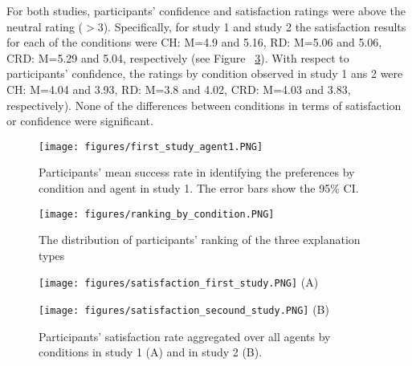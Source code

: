 \documentclass{ecai}
\begin{document}
For both studies, participants' confidence and satisfaction ratings were above the neutral rating ($>3$). Specifically, for study 1 and study 2 the satisfaction results for each of the conditions were CH: M=4.9 and 5.16, RD: M=5.06 and 5.06, CRD: M=5.29 and 5.04, respectively (see Figure ~\ref{fig:satisfaction}). With respect to participants' confidence, the ratings by condition observed in study 1 ans 2 were CH: M=4.04 and 3.93, RD: M=3.8 and 4.02, CRD: M=4.03 and 3.83, respectively). None of the differences between conditions in terms of satisfaction or confidence were significant.



\begin{figure}
\centering
\texttt{[image: figures/first\_study\_agent1.PNG]}
\caption{Participants' mean success rate in identifying the preferences by condition and agent in study 1. The error bars show the 95\% CI.}
\label{fig:first_study_agent1}
    \vspace{-0.2cm}
\end{figure}



\begin{figure}
\centering
\texttt{[image: figures/ranking\_by\_condition.PNG]}
\caption{The distribution of participants' ranking of the three explanation types}
\label{fig:ranking}
\end{figure}


\begin{figure}[t]
\begin{minipage}{0.49\linewidth}
\centering
\texttt{[image: figures/satisfaction\_first\_study.PNG]}
(A)
\end{minipage}
\begin{minipage}{0.49\linewidth}
\centering
\texttt{[image: figures/satisfaction\_secound\_study.PNG]}
(B)
\end{minipage}
\caption{Participants' satisfaction rate aggregated over all agents by conditions in study 1 (A) and in study 2 (B).}
\label{fig:satisfaction}
    \vspace{-0.2cm}
\end{figure}
\end{document}
